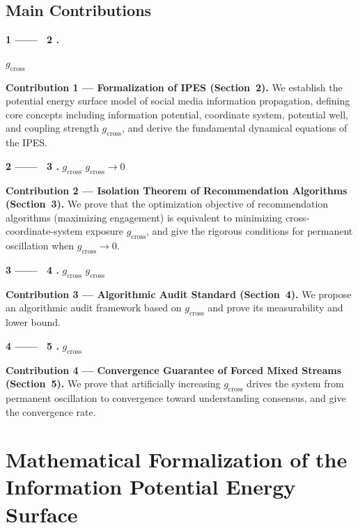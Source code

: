 \documentclass[11pt,a4paper]{article}
\theoremstyle{remark}
\newcommand{\GCoupling}{g_{\text{cross}}}
\begin{document}
\subsection{}
\subsection{Main Contributions}



\noindent\textbf{ 1 —— ~2 .}

$\GCoupling$ 

\textbf{Contribution 1 --- Formalization of IPES (Section~2).}
We establish the potential energy surface model of social media information propagation,
defining core concepts including information potential, coordinate system, potential well,
and coupling strength $\GCoupling$, and derive the fundamental dynamical equations of the IPES.

\medskip
\noindent\textbf{ 2 —— ~3 .}
 $\GCoupling$
 $\GCoupling \to 0$ 

\textbf{Contribution 2 --- Isolation Theorem of Recommendation Algorithms (Section~3).}
We prove that the optimization objective of recommendation algorithms (maximizing engagement)
is equivalent to minimizing cross-coordinate-system exposure $\GCoupling$, and give the
rigorous conditions for permanent oscillation when $\GCoupling \to 0$.

\medskip
\noindent\textbf{ 3 —— ~4 .}
 $\GCoupling$  $\GCoupling$ 

\textbf{Contribution 3 --- Algorithmic Audit Standard (Section~4).}
We propose an algorithmic audit framework based on $\GCoupling$ and prove its
measurability and lower bound.

\medskip
\noindent\textbf{ 4 —— ~5 .}
 $\GCoupling$ 

\textbf{Contribution 4 --- Convergence Guarantee of Forced Mixed Streams (Section~5).}
We prove that artificially increasing $\GCoupling$ drives the system from permanent
oscillation to convergence toward understanding consensus, and give the convergence rate.

\section{}
\section{Mathematical Formalization of the Information Potential Energy Surface}
\end{document}
